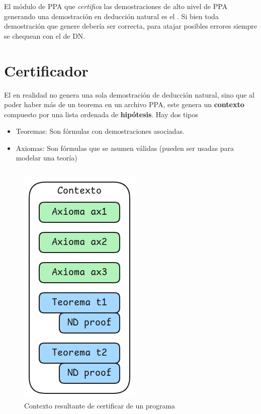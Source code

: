 El módulo de PPA que \textit{certifica} las demostraciones de alto nivel de PPA
generando una demostración en deducción natural es el \modCertifier{}. Si
bien toda demostración que genere debería ser correcta, para atajar posibles
errores siempre se chequean con el \modChecker{} de DN.



\section{Certificador}

El \modCertifier{} en realidad no genera una sola demostración de deducción
natural, sino que al poder haber más de un teorema en un archivo PPA, este
genera un \textbf{contexto} compuesto por una lista ordenada de
\textbf{hipótesis}. Hay dos tipos

\begin{itemize}
    \item Teoremas: Son fórmulas con demostraciones asociadas.
    \item Axiomas: Son fórmulas que se asumen válidas (pueden ser usadas para
    modelar una teoría)
\end{itemize}

\begin{figure}[H]
    \centering
    \begin{multicols}{2}
        \begin{tabular}{c}
            
        \end{tabular}
        \includegraphics[scale=0.5]{img/ppa-context.png}
    \end{multicols}
    \caption{Contexto resultante de certificar de un programa}
\end{figure}


